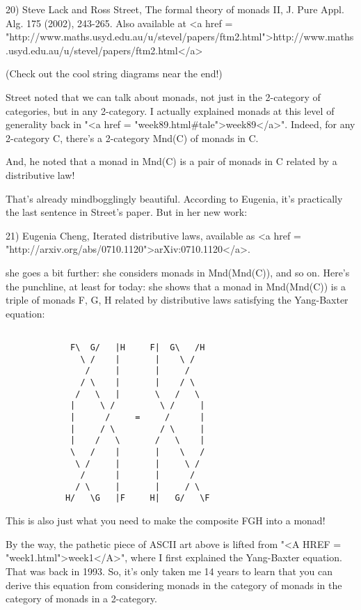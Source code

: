 20) Steve Lack and Ross Street, The formal theory of monads II,
J. Pure Appl. Alg. 175 (2002), 243-265.  Also available at
<a href = "http://www.maths.usyd.edu.au/u/stevel/papers/ftm2.html">http://www.maths.usyd.edu.au/u/stevel/papers/ftm2.html</a>

(Check out the cool string diagrams near the end!)  

Street noted that we can talk about monads, not just in the
2-category of categories, but in any 2-category.  I actually 
explained monads at this level of generality back in 
"<a href = "week89.html#tale">week89</a>".
Indeed, for any 2-category C, there's a 2-category Mnd(C)
of monads in C.  

And, he noted that a monad in Mnd(C) is a pair of monads in C
related by a distributive law!

That's already mindbogglingly beautiful.  According to Eugenia,
it's practically the last sentence in Street's paper.  But in her new work:

21) Eugenia Cheng, Iterated distributive laws, available as
<a href = "http://arxiv.org/abs/0710.1120">arXiv:0710.1120</a>.

she goes a bit further: she considers monads in Mnd(Mnd(C)), 
and so on.   Here's the punchline, at least for today: she shows 
that a monad in Mnd(Mnd(C)) is a triple of monads F, G, H related 
by distributive laws satisfying the Yang-Baxter equation:
  

\begin{verbatim}

             F\  G/   |H     F|  G\   /H
               \ /    |       |    \ /
                /     |       |     /
               / \    |       |    / \
              /   \   |       \   /   \
             |     \ /         \ /     |
             |      /     =     /      | 
             |     / \         / \     |
             |    /   \       /   \    |
             \   /    |       |    \   /
              \ /     |       |     \ /
               /      |       |      /
              / \     |       |     / \
            H/   \G   |F     H|   G/   \F
\end{verbatim}
    

This is also just what you need to make the composite FGH
into a monad!

By the way, the pathetic piece of ASCII art above is lifted 
from "<A HREF = "week1.html">week1</A>", where I first 
explained the Yang-Baxter equation.
That was back in 1993.  So, it's only taken me 14 years to learn
that you can derive this equation from considering monads in
the category of monads in the category of monads in a 2-category.

